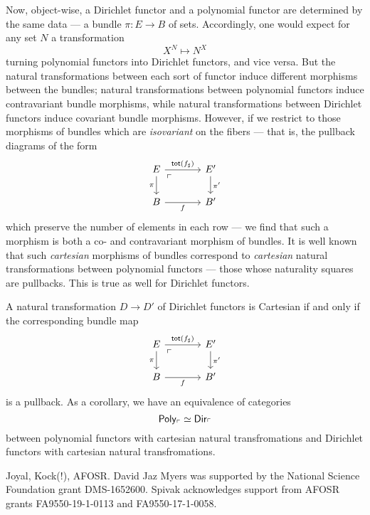 Now, object-wise, a Dirichlet functor and a polynomial functor are determined by
the same data --- a bundle $\pi : E \to B$ of sets. Accordingly, one would
expect for any set $N$ a transformation
$$X^N \mapsto N^X$$
turning polynomial functors into Dirichlet functors, and vice versa. But the
natural transformations between each sort of functor induce different morphisms
between the bundles; natural transformations between polynomial functors induce
contravariant bundle morphisms, while natural transformations between Dirichlet
functors induce covariant bundle morphisms. However, if we restrict to those
morphisms of bundles which are \emph{isovariant} on the fibers --- that is, the
pullback diagrams of the form
\[
  \begin{tikzcd}[column sep=large]
E \arrow[r, "\term{tot}(f_{\sharp})"] \arrow[d, "\pi"'] \arrow[dr, phantom,
"\ulcorner" very near start] & E' \arrow[d, "\pi'"] \\
B \arrow[r, "f"']                                       & B'                  
\end{tikzcd}
\]
which preserve the number of elements in each row --- we find that such a morphism
is both a co- and contravariant morphism of bundles. It is well known that such
\emph{cartesian} morphisms of bundles correspond to \emph{cartesian} natural
transformations between polynomial functors \cite[Theorem 3.8]{GambinoKock} --- those whose naturality
squares are pullbacks. This is true as well for Dirichlet functors.
\begin{thm}
A natural transformation $D \to D'$ of Dirichlet functors is Cartesian if and
only if the corresponding bundle map
\[
  \begin{tikzcd}[column sep=large]
E \arrow[r, "\term{tot}(f_{\sharp})"] \arrow[d, "\pi"'] \arrow[dr, phantom,
"\ulcorner" very near start] & E' \arrow[d, "\pi'"] \\
B \arrow[r, "f"']                                       & B'                  
\end{tikzcd}
\]
is a pullback. As a corollary, we have an equivalence of categories
$$\mathsf{{Poly}}_{\ulcorner} \simeq \operatorname{\mathsf{{Dir}}}_{\ulcorner}$$
between polynomial functors with cartesian natural transfromations and Dirichlet
functors with cartesian natural transfromations.
\end{thm}



\begin{acknowledgements}
Joyal, Kock(!), AFOSR. David Jaz Myers was supported by the National Science Foundation grant DMS-1652600.
Spivak acknowledges support from AFOSR grants FA9550-19-1-0113 and FA9550-17-1-0058.
\end{acknowledgements}


